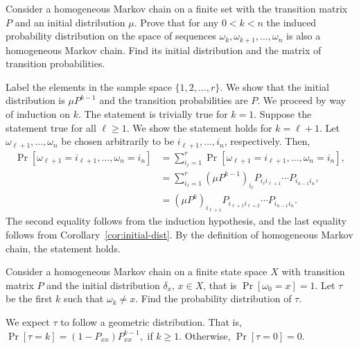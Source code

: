 \begin{problem}{2}
    Consider a homogeneous Markov chain on a finite set with the transition matrix $P$ and an initial distribution $\mu$. Prove that for any $0 < k < n$ the induced probability distribution on the space of sequences $\omega_k,\omega_{k+1},\ldots, \omega_n$ is also a homogeneous Markov chain. Find its initial distribution and the matrix of transition probabilities.
\end{problem}
\begin{solution}
    Label the elements in the sample space $\{1,2,\ldots,r\}$. We show that the initial distribution is $\mu P^{k-1}$ and the transition probabilities are $P$. We proceed by way of induction on $k$. The statement is trivially true for $k=1$. Suppose the statement true for all $\ell \geq 1$. We show the statement holds for $k=\ell+1$. Let $\omega_{\ell+1},\ldots,\omega_n$ be chosen arbitrarily to be $i_{\ell+1},\ldots,i_n$, respectively. Then, 
    \begin{align*}
        \Pr[\omega_{\ell+1}=i_{\ell+1},\ldots,\omega_n=i_n] &= \sum_{i_\ell = 1}^r \Pr[\omega_{\ell+1}=i_{\ell+1},\ldots,\omega_n=i_n], \\
        &= \sum_{i_\ell=1}^r \left(\mu P^{k-1}\right)_{i_\ell} P_{i_\ell i_{\ell+1}}\cdots P_{i_{n-1}i_n}, \\
        &= \left(\mu P^k\right)_{i_{\ell + 1}} P_{i_{\ell + 1}i_{\ell+2}}\cdots P_{i_{n-1}i_n}.  
    \end{align*}
    The second equality follows from the induction hypothesis, and the last equality follows from Corollary~\ref{cor:initial-dist}. By the definition of homogeneous Markov chain, the statement holds.
\end{solution}

\begin{problem}{3}
    Consider a homogeneous Markov chain on a finite state space $X$ with transition matrix $P$ and the initial distribution $\delta_x$, $x \in X$, that is $\Pr[\omega_0 = x] = 1$. Let $\tau$ be the first $k$ such that $\omega_k \neq x$. Find the probability distribution of $\tau$. 
\end{problem}
\begin{solution}
    We expect $\tau$ to follow a geometric distribution. That is, $\Pr[\tau=k] = (1-P_{xx})P_{xx}^{k-1},$
    if $k \geq 1$. Otherwise, $\Pr[\tau=0] = 0$. 
\end{solution}

